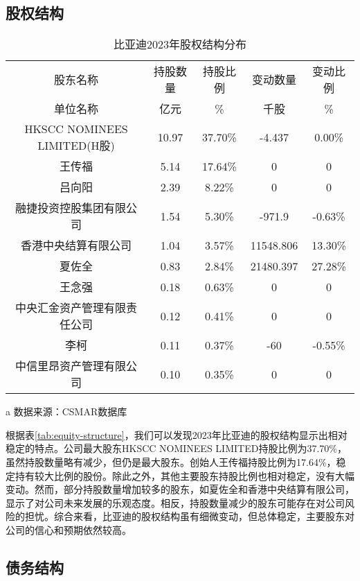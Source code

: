 \subsection{股权结构}
\begin{table}
  \centering
  \begin{threeparttable}[c]
    \caption{比亚迪2023年股权结构分布}
    \label{tab:equity-structure}
    \begin{tabular}{ccccc}
      \toprule
        股东名称 & 持股数量 & 持股比例 & 变动数量 & 变动比例 \\
        单位名称 & 亿元    &  \%      &  千股   &  \%      \\
      \midrule
        HKSCC NOMINEES LIMITED(H股) & 10.97  & 37.70\% & -4.437 & 0.00\% \\
        王传福 & 5.14  & 17.64\% & 0 & 0 \\
        吕向阳 & 2.39  & 8.22\% & 0 & 0 \\
        融捷投资控股集团有限公司 & 1.54  & 5.30\% & -971.9 & -0.63\% \\
        香港中央结算有限公司 & 1.04  & 3.57\% & 11548.806 & 13.30\% \\
        夏佐全 & 0.83  & 2.84\% & 21480.397 & 27.28\% \\
        王念强 & 0.18  & 0.63\% & 0 & 0 \\
        中央汇金资产管理有限责任公司 & 0.12  & 0.41\% & 0 & 0 \\
        李柯 & 0.11  & 0.37\% & -60 & -0.55\% \\
        中信里昂资产管理有限公司 & 0.10  & 0.35\% & 0 & 0 \\
      \bottomrule
    \end{tabular}
    \begin{tablenotes}
      \item [a] 数据来源：CSMAR数据库
    \end{tablenotes}
  \end{threeparttable}
\end{table}
根据表\eqref{tab:equity-structure}，我们可以发现2023年比亚迪的股权结构显示出相对稳定的特点。公司最大股东HKSCC NOMINEES LIMITED持股比例为37.70\%，虽然持股数量略有减少，但仍是最大股东。创始人王传福持股比例为17.64\%，稳定持有较大比例的股份。除此之外，其他主要股东持股比例也相对稳定，没有大幅变动。然而，部分持股数量增加较多的股东，如夏佐全和香港中央结算有限公司，显示了对公司未来发展的乐观态度。相反，持股数量减少的股东可能存在对公司风险的担忧。综合来看，比亚迪的股权结构虽有细微变动，但总体稳定，主要股东对公司的信心和预期依然较高。
\subsection{债务结构}
